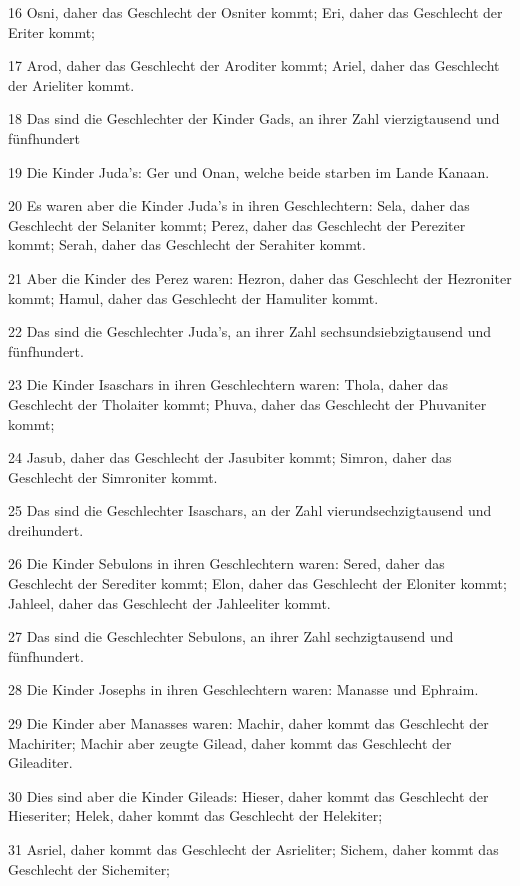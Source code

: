 \par 16 Osni, daher das Geschlecht der Osniter kommt; Eri, daher das Geschlecht der Eriter kommt;
\par 17 Arod, daher das Geschlecht der Aroditer kommt; Ariel, daher das Geschlecht der Arieliter kommt.
\par 18 Das sind die Geschlechter der Kinder Gads, an ihrer Zahl vierzigtausend und fünfhundert
\par 19 Die Kinder Juda's: Ger und Onan, welche beide starben im Lande Kanaan.
\par 20 Es waren aber die Kinder Juda's in ihren Geschlechtern: Sela, daher das Geschlecht der Selaniter kommt; Perez, daher das Geschlecht der Pereziter kommt; Serah, daher das Geschlecht der Serahiter kommt.
\par 21 Aber die Kinder des Perez waren: Hezron, daher das Geschlecht der Hezroniter kommt; Hamul, daher das Geschlecht der Hamuliter kommt.
\par 22 Das sind die Geschlechter Juda's, an ihrer Zahl sechsundsiebzigtausend und fünfhundert.
\par 23 Die Kinder Isaschars in ihren Geschlechtern waren: Thola, daher das Geschlecht der Tholaiter kommt; Phuva, daher das Geschlecht der Phuvaniter kommt;
\par 24 Jasub, daher das Geschlecht der Jasubiter kommt; Simron, daher das Geschlecht der Simroniter kommt.
\par 25 Das sind die Geschlechter Isaschars, an der Zahl vierundsechzigtausend und dreihundert.
\par 26 Die Kinder Sebulons in ihren Geschlechtern waren: Sered, daher das Geschlecht der Serediter kommt; Elon, daher das Geschlecht der Eloniter kommt; Jahleel, daher das Geschlecht der Jahleeliter kommt.
\par 27 Das sind die Geschlechter Sebulons, an ihrer Zahl sechzigtausend und fünfhundert.
\par 28 Die Kinder Josephs in ihren Geschlechtern waren: Manasse und Ephraim.
\par 29 Die Kinder aber Manasses waren: Machir, daher kommt das Geschlecht der Machiriter; Machir aber zeugte Gilead, daher kommt das Geschlecht der Gileaditer.
\par 30 Dies sind aber die Kinder Gileads: Hieser, daher kommt das Geschlecht der Hieseriter; Helek, daher kommt das Geschlecht der Helekiter;
\par 31 Asriel, daher kommt das Geschlecht der Asrieliter; Sichem, daher kommt das Geschlecht der Sichemiter;
